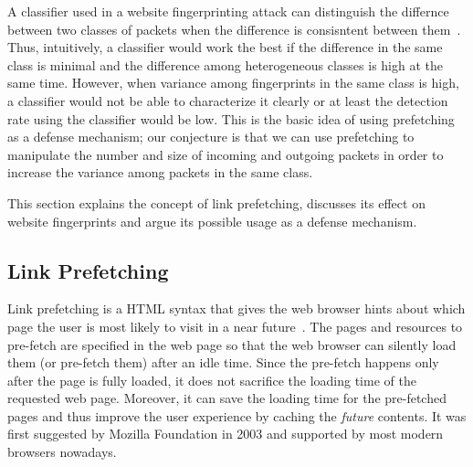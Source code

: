
A classifier used in a website fingerprinting attack can distinguish the differnce between two classes of packets when the difference is consisntent between them~\cite{Cai:2014kjb}. %
Thus, intuitively, a classifier would work the best if the difference in the same class is minimal and the difference among heterogeneous classes is high at the same time.
However, when variance among fingerprints in the same class is high, a classifier would not be able to characterize it clearly or at least the detection rate using the classifier would be low.
This is the basic idea of using prefetching as a defense mechanism; our conjecture is that we can use prefetching to manipulate the number and size of incoming and outgoing packets in order to increase the variance among packets in the same class.

This section explains the concept of link prefetching, discusses its effect on website fingerprints and argue its possible usage as a defense mechanism.

\subsection{Link Prefetching}

Link prefetching is a HTML syntax that gives the web browser hints about which page the user is most likely to visit in a near future~\cite{fisher2003, fisher2004link}. 
The pages and resources to pre-fetch are specified in the web page so that the web browser can silently load them (or pre-fetch them) after an idle time.
Since the pre-fetch happens only after the page is fully loaded, it does not sacrifice the loading time of the requested web page.
Moreover, it can save the loading time for the pre-fetched pages and thus improve the user experience by caching the {\it future} contents.
It was first suggested by Mozilla Foundation in 2003 and supported by most modern browsers nowadays.

